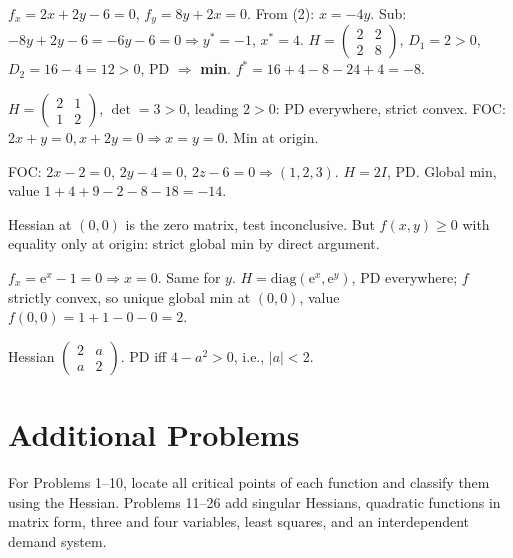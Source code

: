 \begin{solutions}
    \item $f_x = 2 x + 2 y - 6 = 0$, $f_y = 8 y + 2 x = 0$. From (2): $x = -4 y$. Sub: $-8 y + 2 y - 6 = -6 y - 6 = 0 \Rightarrow y^* = -1$, $x^* = 4$. $H = \begin{pmatrix} 2 & 2 \\ 2 & 8 \end{pmatrix}$, $D_1 = 2 > 0$, $D_2 = 16 - 4 = 12 > 0$, PD $\Rightarrow$ \textbf{min}. $f^* = 16 + 4 - 8 - 24 + 4 = -8$.
    \item $H = \begin{pmatrix} 2 & 1 \\ 1 & 2 \end{pmatrix}$, $\det = 3 > 0$, leading $2 > 0$: PD everywhere, strict convex. FOC: $2x + y = 0, x + 2y = 0 \Rightarrow x = y = 0$. Min at origin.
    \item FOC: $2x - 2 = 0$, $2y - 4 = 0$, $2z - 6 = 0 \Rightarrow (1,2,3)$. $H = 2I$, PD. Global min, value $1+4+9-2-8-18 = -14$.
    \item Hessian at $(0,0)$ is the zero matrix, test inconclusive. But $f(x,y) \ge 0$ with equality only at origin: strict global min by direct argument.
    \item $f_x = \mathrm{e}^x - 1 = 0 \Rightarrow x = 0$. Same for $y$. $H = \mathrm{diag}(\mathrm{e}^x, \mathrm{e}^y)$, PD everywhere; $f$ strictly convex, so unique global min at $(0,0)$, value $f(0,0) = 1 + 1 - 0 - 0 = 2$.
    \item Hessian $\begin{pmatrix} 2 & a \\ a & 2 \end{pmatrix}$. PD iff $4 - a^2 > 0$, i.e., $|a| < 2$.
\end{solutions}

\section{Additional Problems}

For Problems 1--10, locate all critical points of each function and
classify them using the Hessian. Problems 11--26 add singular Hessians,
quadratic functions in matrix form, three and four variables, least squares,
and an interdependent demand system.

